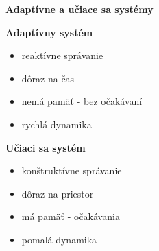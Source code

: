 \documentclass[xcolor=dvipsnames]{beamer}
\begin{document}
\begin{frame}{\bf Adaptívne a učiace sa systémy}

\begin{minipage}{.5\textwidth}
  {\bf Adaptívny systém}

  \begin{itemize}
  \item reaktívne správanie
  \item dôraz na čas
  \item nemá pamäť - bez očakávaní
  \item rychlá dynamika
  \end{itemize}

\end{minipage}%
\begin{minipage}{.5\textwidth}
  {\bf Učiaci sa systém}

  \begin{itemize}
  \item konštruktívne správanie
  \item dôraz na priestor
  \item má pamäť - očakávania
  \item pomalá dynamika
  \end{itemize}

\end{minipage}
\end{frame}
\end{document}
